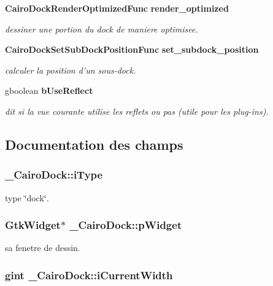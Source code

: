 \begin{CompactItemize}
{\bf CairoDockRenderOptimizedFunc} {\bf render\_\-optimized}
\begin{CompactList}\small\item\em dessiner une portion du dock de maniere optimisee. \item\end{CompactList}\item 
{\bf CairoDockSetSubDockPositionFunc} {\bf set\_\-subdock\_\-position}
\begin{CompactList}\small\item\em calculer la position d'un sous-dock. \item\end{CompactList}\item 
gboolean {\bf bUseReflect}
\begin{CompactList}\small\item\em dit si la vue courante utilise les reflets ou pas (utile pour les plug-ins). \item\end{CompactList}\end{CompactItemize}


\subsection{Documentation des champs}
\subsubsection{ {\bf \_\-CairoDock::iType}}\label{struct__CairoDock_c1fbd9f7a45c599b9ceeddd4614f0208}


type \char`\"{}dock\char`\"{}. 

\subsubsection{\setlength{\rightskip}{0pt plus 5cm}GtkWidget$\ast$ {\bf \_\-CairoDock::pWidget}}\label{struct__CairoDock_9e5f79b421109b2ac456ec394cdc3c24}


sa fenetre de dessin. 

\subsubsection{\setlength{\rightskip}{0pt plus 5cm}gint {\bf \_\-CairoDock::iCurrentWidth}}\label{struct__CairoDock_43e54fd882b5e767cc3e6f2b148c6f1e}


